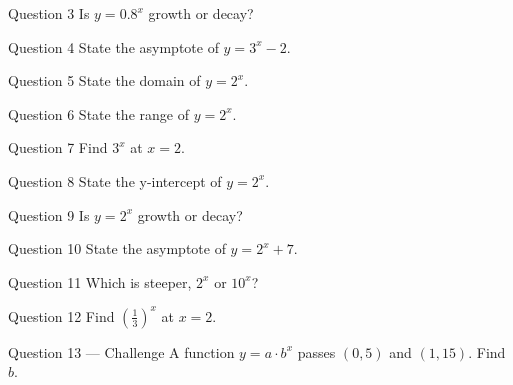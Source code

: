 \documentclass[11pt]{article}
\begin{document}
\begin{qbox}{Question 3}
Is $y=0.8^x$ growth or decay?\workspace{2.4cm}
\end{qbox}

\begin{qbox}{Question 4}
State the asymptote of $y=3^x-2$.\workspace{2.4cm}
\end{qbox}

\begin{qbox}{Question 5}
State the domain of $y=2^x$.\workspace{2.4cm}
\end{qbox}

\begin{qbox}{Question 6}
State the range of $y=2^x$.\workspace{2.4cm}
\end{qbox}

\begin{qbox}{Question 7}
Find $3^x$ at $x=2$.\workspace{2.4cm}
\end{qbox}

\begin{qbox}{Question 8}
State the y-intercept of $y=2^x$.\workspace{2.4cm}
\end{qbox}

\begin{qbox}{Question 9}
Is $y=2^x$ growth or decay?\workspace{2.4cm}
\end{qbox}

\begin{qbox}{Question 10}
State the asymptote of $y=2^x+7$.\workspace{2.4cm}
\end{qbox}

\begin{qbox}{Question 11}
Which is steeper, $2^x$ or $10^x$?\workspace{2.4cm}
\end{qbox}

\begin{qbox}{Question 12}
Find $\left(\tfrac13\right)^x$ at $x=2$.\workspace{2.4cm}
\end{qbox}

\begin{qbox}{Question 13 --- Challenge}
A function $y=a\cdot b^x$ passes $(0,5)$ and $(1,15)$. Find $b$.\workspace{2.6cm}
\end{qbox}

\clearpage
{}
\end{document}
